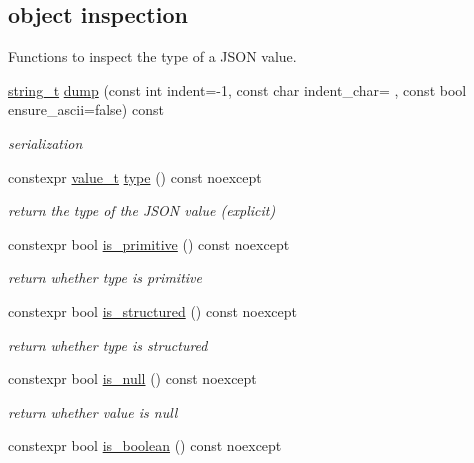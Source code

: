 \subsection*{object inspection}
\label{_amgrpbbb01a37b8f261ae5b5799058dcac1a0}%
Functions to inspect the type of a J\+S\+ON value. \begin{DoxyCompactItemize}
\item 
\hyperlink{classnlohmann_1_1basic__json_a61f8566a1a85a424c7266fb531dca005}{string\+\_\+t} \hyperlink{classnlohmann_1_1basic__json_a5adea76fedba9898d404fef8598aa663}{dump} (const int indent=-\/1, const char indent\+\_\+char=\textquotesingle{} \textquotesingle{}, const bool ensure\+\_\+ascii=false) const
\begin{DoxyCompactList}\small\item\em serialization \end{DoxyCompactList}\item 
constexpr \hyperlink{namespacenlohmann_1_1detail_a1ed8fc6239da25abcaf681d30ace4985}{value\+\_\+t} \hyperlink{classnlohmann_1_1basic__json_a2b2d781d7f2a4ee41bc0016e931cadf7}{type} () const noexcept
\begin{DoxyCompactList}\small\item\em return the type of the J\+S\+ON value (explicit) \end{DoxyCompactList}\item 
constexpr bool \hyperlink{classnlohmann_1_1basic__json_a6362b88718eb5c6d4fed6a61eed44b95}{is\+\_\+primitive} () const noexcept
\begin{DoxyCompactList}\small\item\em return whether type is primitive \end{DoxyCompactList}\item 
constexpr bool \hyperlink{classnlohmann_1_1basic__json_a9f68a0af820c3ced7f9d17851ce4c22d}{is\+\_\+structured} () const noexcept
\begin{DoxyCompactList}\small\item\em return whether type is structured \end{DoxyCompactList}\item 
constexpr bool \hyperlink{classnlohmann_1_1basic__json_a8faa039ca82427ed29c486ffd00600c3}{is\+\_\+null} () const noexcept
\begin{DoxyCompactList}\small\item\em return whether value is null \end{DoxyCompactList}\item 
constexpr bool \hyperlink{classnlohmann_1_1basic__json_a943e8cb182d0f2365c76d64b42eaa6fd}{is\+\_\+boolean} () const noexcept

\end{DoxyCompactItemize}
